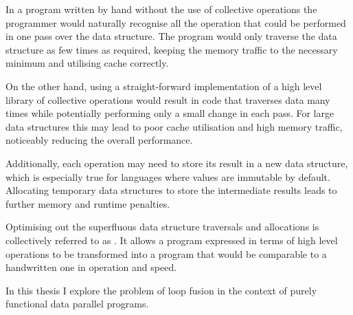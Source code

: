 \documentclass[preamble.tex]{subfiles}
\begin{document}
In a program written by hand without the use of collective operations the programmer would naturally recognise all the operation that could be performed in one pass over the data structure. The program would only traverse the data structure as few times as required, keeping the memory traffic to the necessary minimum and utilising cache correctly.

On the other hand, using a straight-forward implementation of a high level library of collective operations would result in code that traverses data many times while potentially performing only a small change in each pass. For large data structures this may lead to poor cache utilisation and high memory traffic, noticeably reducing the overall performance.

Additionally, each operation may need to store its result in a new data structure, which is especially true for languages where values are immutable by default. Allocating temporary data structures to store the intermediate results leads to further memory and runtime penalties.

Optimising out the superfluous data structure traversals and allocations is collectively referred to as \ifusion{}. It allows a program expressed in terms of high level operations to be transformed into a program that would be comparable to a handwritten one in operation and speed.

In this thesis I explore the problem of loop fusion in the context of purely functional data parallel programs. %
\end{document}
